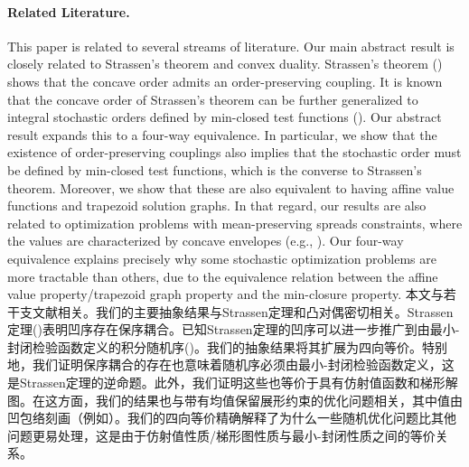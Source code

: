 \documentclass[12pt,letterpaper]{article}
\newenvironment{original}{\color{black}}{}
\newenvironment{translation}{\color{blue}}{}
\theoremstyle{plain}
\theoremstyle{definition}
\theoremstyle{remark}
\theoremstyle{definition}
\begin{document}
\paragraph{Related Literature.}\hspace{-2mm}
\begin{original}
This paper is related to several streams of literature. Our main abstract result is closely related to Strassen's theorem and convex duality. Strassen's theorem (\citealt[][]{Strassen1965}) shows that the concave order admits an order-preserving coupling. It is known that the concave order of Strassen's theorem can be further generalized to integral stochastic orders defined by min-closed test functions (\citealt{meyer1966}). Our abstract result expands this to a four-way equivalence. In particular, we show that the existence of order-preserving couplings also implies that the stochastic order must be defined by min-closed test functions, which is the converse to Strassen's theorem. Moreover, we show that these are also equivalent to having affine value functions and trapezoid solution graphs. In that regard, our results are also related to optimization problems with mean-preserving spreads constraints, where the values are characterized by concave envelopes (e.g., \citealt[][]{Kemperman1968,Myerson1981,AumannMaschler1995,Kamenica2011,BeiglbockNutz2014}). Our four-way equivalence explains precisely why some stochastic optimization problems are more tractable than others, due to the equivalence relation between the affine value property/trapezoid graph property and the min-closure property.
\end{original}
\begin{translation}
本文与若干支文献相关。我们的主要抽象结果与Strassen定理和凸对偶密切相关。Strassen定理(\citealt[][]{Strassen1965})表明凹序存在保序耦合。已知Strassen定理的凹序可以进一步推广到由最小-封闭检验函数定义的积分随机序(\citealt{meyer1966})。我们的抽象结果将其扩展为四向等价。特别地，我们证明保序耦合的存在也意味着随机序必须由最小-封闭检验函数定义，这是Strassen定理的逆命题。此外，我们证明这些也等价于具有仿射值函数和梯形解图。在这方面，我们的结果也与带有均值保留展形约束的优化问题相关，其中值由凹包络刻画（例如\citealt[][]{Kemperman1968,Myerson1981,AumannMaschler1995,Kamenica2011,BeiglbockNutz2014}）。我们的四向等价精确解释了为什么一些随机优化问题比其他问题更易处理，这是由于仿射值性质/梯形图性质与最小-封闭性质之间的等价关系。
\end{translation}
\end{document}

